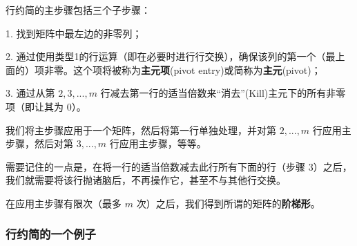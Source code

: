 行约简的主步骤包括三个子步骤：

1. 找到矩阵中最左边的非零列；

2. 通过使用类型1的行运算（即在必要时进行行交换），确保该列的第一个（最上面的）项非零。这个项将被称为\textbf{主元项}(pivot entry)或简称为\textbf{主元}(pivot)；

3. 通过从第 $2,3,...,m$ 行减去第一行的适当倍数来“消去”(Kill)主元下的所有非零项（即让其为 0）。

我们将主步骤应用于一个矩阵，然后将第一行单独处理，并对第 $2,...,m$ 行应用主步骤，然后对第 $3,...,m$ 行应用主步骤，等等。

需要记住的一点是，在将一行的适当倍数减去此行所有下面的行（步骤 3）之后，我们就需要将该行抛诸脑后，不再操作它，甚至不与其他行交换。

在应用主步骤有限次（最多 $m$ 次）之后，我们得到所谓的矩阵的\textbf{阶梯形}。

\subsubsection{行约简的一个例子}\label{sec:02-02-02-01}

